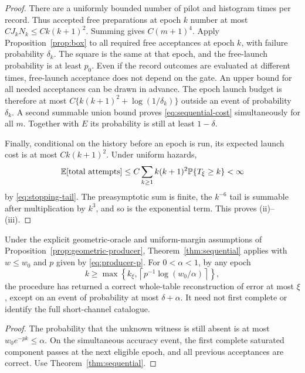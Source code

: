 \begin{proof}
There are a uniformly bounded number of pilot and histogram times per
record. Thus accepted free preparations at epoch $k$ number at most
$C J_kN_k\le Ck(k+1)^2$. Summing gives $C(m+1)^4$. Apply
Proposition~\ref{prop:box} to all required free acceptances at epoch $k$,
with failure probability $\delta_k$. The square is the same at that
epoch, and the free-launch probability is at least $p_0$. Even if the
record outcomes are evaluated at different times, free-launch acceptance
does not depend on the gate. An upper bound for all needed acceptances
can be drawn in advance. The epoch launch budget is therefore at most
$C\{k(k+1)^2+\log(1/\delta_k)\}$ outside an event of probability
$\delta_k$. A second summable union bound proves \eqref{eq:sequential-cost}
simultaneously for all $m$. Together with $E$ its probability is still
at least $1-\delta$.

Finally, conditional on the history before an epoch is run, its expected
launch cost is at most $Ck(k+1)^2$. Under uniform hazards,
\[
 \mathbb E[\hbox{total attempts}]
 \le C\sum_{k\ge1} k(k+1)^2\mathbb P\{T_\xi\ge k\}<\infty
\]
by \eqref{eq:stopping-tail}. The preasymptotic sum is finite, the
$k^{-6}$ tail is summable after multiplication by $k^3$, and so is the
exponential term. This proves (ii)--(iii).
\end{proof}

\begin{corollary}
\label{cor:scanner-discovery}
Under the explicit geometric-oracle and uniform-margin assumptions of
Proposition~\ref{prop:geometric-producer}, Theorem~\ref{thm:sequential}
applies with $w\le w_0$ and $p$ given by \eqref{eq:producer-p}. For
$0<\alpha<1$, by any epoch
\begin{equation}\label{eq:scan-stopping}
 k\ge\max\left\{k_\xi,\left\lceil p^{-1}\log(w_0/\alpha)\right\rceil\right\},
\end{equation}
the procedure has returned a correct whole-table reconstruction of error
at most $\xi$, except on an event of probability at most $\delta+\alpha$.
It need not first complete or identify the full short-channel catalogue.
\end{corollary}
\begin{proof}
The probability that the unknown witness is still absent is at most
$w_0e^{-pk}\le\alpha$. On the simultaneous accuracy event, the first
complete saturated component passes at the next eligible epoch, and
all previous acceptances are correct. Use Theorem~\ref{thm:sequential}.
\end{proof}

